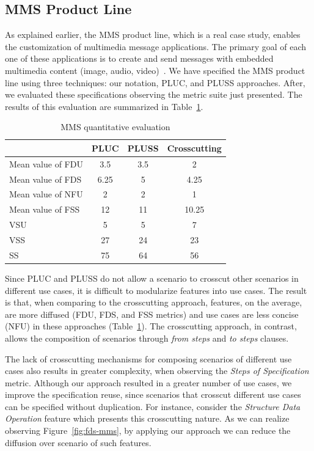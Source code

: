 \documentclass{acm_proc_article-sp}
\begin{document}
{\subsection{MMS Product Line}

As explained earlier, the MMS product line, which is a real case study, enables the customization of 
multimedia message applications. The primary goal of each one of these applications is to create and 
send messages with embedded multimedia content (image, audio, video)~\cite{rbonifacio-ea-2008}. 
We have specified the MMS product line using three techniques: our notation, PLUC, and PLUSS approaches. After, we evaluated these specifications observing the metric suite just presented. The results of this evaluation are summarized in Table~\ref{tab:metrics}. 

\begin{table}[htb]
\centering
\caption{MMS quantitative evaluation}
\label{tab:metrics}
\begin{small}
\begin{tabular}{lccc} \hline
					& PLUC 	& PLUSS 	& Crosscutting	\\ \hline
Mean value of FDU 		& 3.5	& 3.5	& 2		\\
Mean value of FDS 		& 6.25	& 5		& 4.25	\\
Mean value of NFU 		& 2		& 2		& 1		\\
Mean value of FSS 		&12		& 11		& 10.25	\\ 
VSU 					& 5		& 5		& 7		\\
VSS 					& 27		& 24		& 23		\\
SS 					& 75		& 64		& 56		\\	\hline
\end{tabular}
\end{small}
\end{table}

Since PLUC and PLUSS do not allow a
scenario to crosscut other scenarios in different use cases, it
is difficult to modularize features into use cases. The
result is that, when comparing to the crosscutting approach,
features, on the average,  are more 
diffused (FDU, FDS, and FSS metrics) and use cases are
less concise (NFU) in these approaches (Table~\ref{tab:metrics}). The crosscutting
approach, in contrast, allows the composition of scenarios
through \emph{from steps} and \emph{to steps} clauses. 

The lack of crosscutting mechanisms for composing scenarios of different use cases also results in greater complexity, when observing the \emph{Steps of Specification} metric. Although our approach resulted in a greater number of use cases, we improve the specification reuse, since scenarios that crosscut different use cases can be specified without duplication. For instance, consider the \emph{Structure Data Operation} feature which presents this crosscutting nature. As we can realize observing Figure~\ref{fig:fds-mms}, by applying our approach we can reduce the diffusion over scenario of such features.

}
\end{document}
